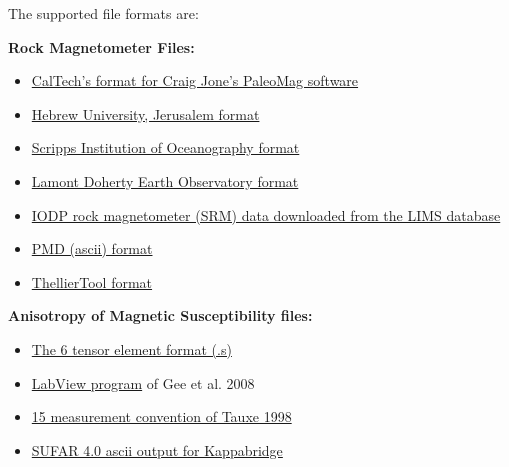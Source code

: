 \documentclass[11pt]{book}
\begin{document}
{The supported file formats are:   

{\bf Rock Magnetometer Files:}

\begin{itemize}
\item \href{#CIT_magic.py}{CalTech's format for Craig Jone's PaleoMag software}
\item \href{#HUJI_magic.py}{Hebrew University, Jerusalem format}
\item \href{#sio_magic.py}{Scripps Institution of Oceanography format}
\item \href{#LDEO_magic.py}{Lamont Doherty Earth Observatory format} 
\item \href{#IODP_csv_magic.py}{IODP rock magnetometer (SRM) data downloaded from the LIMS database}
\item \href{#PMD_magic.py}{PMD (ascii) format}
\item \href{#TDT_magic.py}{ThellierTool format}
\end{itemize}

{\bf Anisotropy of Magnetic Susceptibility files:}

\begin{itemize}
\item \href{#s_magic.py}{The 6 tensor element format (.s)}
\item \href{#KLY4S_magic.py}{LabView program} of Gee et al. 2008 \nocite{gee08}
\item \href{#k15\_magic.py}{15 measurement convention of Tauxe 1998 \nocite{tauxe98}}
\item \href{#SUFAR4-asc\_magic.py}{SUFAR 4.0 ascii output for Kappabridge}
\end{itemize}

}
\end{document}
